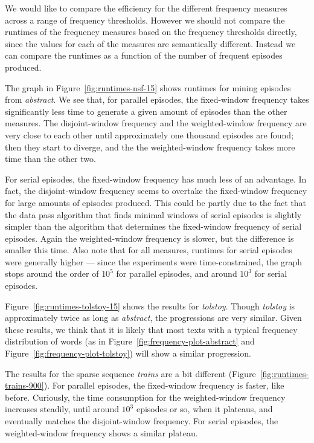 We would like to compare the efficiency for the different frequency measures across a range of frequency thresholds. However we should not compare the runtimes of the frequency measures based on the frequency thresholds directly, since the values for each of the measures are semantically different. Instead we can compare the runtimes as a function of the number of frequent episodes produced.

The graph in Figure~\ref{fig:runtimes-nsf-15} shows runtimes for mining episodes from \emph{abstract}. We see that, for parallel episodes, the fixed-window frequency takes significantly less time to generate a given amount of episodes than the other measures. The disjoint-window frequency and the weighted-window frequency are very close to each other until approximately one thousand episodes are found; then they start to diverge, and the the weighted-window frequency takes more time than the other two.

For serial episodes, the fixed-window frequency has much less of an advantage. In fact, the disjoint-window frequency seems to overtake the fixed-window frequency for large amounts of episodes produced. This could be partly due to the fact that the data pass algorithm that finds minimal windows of serial episodes is slightly simpler than the algorithm that determines the fixed-window frequency of serial episodes. Again the weighted-window frequency is slower, but the difference is smaller this time. Also note that for all measures, runtimes for serial episodes were generally higher --- since the experiments were time-constrained, the graph stops around the order of $ 10^5 $ for parallel episodes, and around $ 10^3 $ for serial episodes.

Figure~\ref{fig:runtimes-tolstoy-15} shows the results for \emph{tolstoy}. Though \emph{tolstoy} is approximately twice as long as \emph{abstract}, the progressions are very similar. Given these results, we think that it is likely that most texts with a typical frequency distribution of words (as in Figure~\ref{fig:frequency-plot-abstract} and Figure~\ref{fig:frequency-plot-tolstoy}) will show a similar progression.

The results for the sparse sequence \emph{trains} are a bit different (Figure~\ref{fig:runtimes-trains-900}). For parallel episodes, the fixed-window frequency is faster, like before. Curiously, the time consumption for the weighted-window frequency increases steadily, until around $ 10^3 $ episodes or so, when it plateaus, and eventually matches the disjoint-window frequency. For serial episodes, the weighted-window frequency shows a similar plateau.


